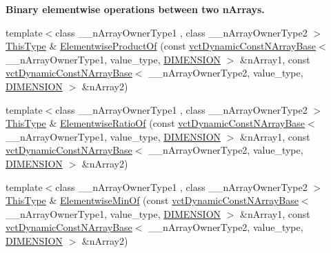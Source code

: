 \begin{Indent}{\bf Binary elementwise operations between two n\+Arrays.}
\begin{DoxyCompactItemize}
\item 
{\footnotesize template$<$class \+\_\+\+\_\+n\+Array\+Owner\+Type1 , class \+\_\+\+\_\+n\+Array\+Owner\+Type2 $>$ }\\\hyperlink{classvct_dynamic_const_n_array_base_a5123caffcf1455a1b99003877eade897}{This\+Type} \& \hyperlink{classvct_dynamic_n_array_base_a703a8bd5b1b643365ee9917a66a0ab30}{Elementwise\+Product\+Of} (const \hyperlink{classvct_dynamic_const_n_array_base}{vct\+Dynamic\+Const\+N\+Array\+Base}$<$ \+\_\+\+\_\+n\+Array\+Owner\+Type1, value\+\_\+type, \hyperlink{classvct_dynamic_n_array_base_aa66532d28588bdf26d08fb593db815d6abfcde386ec801b212d7c42d63a4f3837}{D\+I\+M\+E\+N\+S\+I\+O\+N} $>$ \&n\+Array1, const \hyperlink{classvct_dynamic_const_n_array_base}{vct\+Dynamic\+Const\+N\+Array\+Base}$<$ \+\_\+\+\_\+n\+Array\+Owner\+Type2, value\+\_\+type, \hyperlink{classvct_dynamic_n_array_base_aa66532d28588bdf26d08fb593db815d6abfcde386ec801b212d7c42d63a4f3837}{D\+I\+M\+E\+N\+S\+I\+O\+N} $>$ \&n\+Array2)
\item 
{\footnotesize template$<$class \+\_\+\+\_\+n\+Array\+Owner\+Type1 , class \+\_\+\+\_\+n\+Array\+Owner\+Type2 $>$ }\\\hyperlink{classvct_dynamic_const_n_array_base_a5123caffcf1455a1b99003877eade897}{This\+Type} \& \hyperlink{classvct_dynamic_n_array_base_aeab4d58e6af9be92ae2bc183eb971d92}{Elementwise\+Ratio\+Of} (const \hyperlink{classvct_dynamic_const_n_array_base}{vct\+Dynamic\+Const\+N\+Array\+Base}$<$ \+\_\+\+\_\+n\+Array\+Owner\+Type1, value\+\_\+type, \hyperlink{classvct_dynamic_n_array_base_aa66532d28588bdf26d08fb593db815d6abfcde386ec801b212d7c42d63a4f3837}{D\+I\+M\+E\+N\+S\+I\+O\+N} $>$ \&n\+Array1, const \hyperlink{classvct_dynamic_const_n_array_base}{vct\+Dynamic\+Const\+N\+Array\+Base}$<$ \+\_\+\+\_\+n\+Array\+Owner\+Type2, value\+\_\+type, \hyperlink{classvct_dynamic_n_array_base_aa66532d28588bdf26d08fb593db815d6abfcde386ec801b212d7c42d63a4f3837}{D\+I\+M\+E\+N\+S\+I\+O\+N} $>$ \&n\+Array2)
\item 
{\footnotesize template$<$class \+\_\+\+\_\+n\+Array\+Owner\+Type1 , class \+\_\+\+\_\+n\+Array\+Owner\+Type2 $>$ }\\\hyperlink{classvct_dynamic_const_n_array_base_a5123caffcf1455a1b99003877eade897}{This\+Type} \& \hyperlink{classvct_dynamic_n_array_base_aa29a945c1f4ce1bb02ca5f5c0c79a343}{Elementwise\+Min\+Of} (const \hyperlink{classvct_dynamic_const_n_array_base}{vct\+Dynamic\+Const\+N\+Array\+Base}$<$ \+\_\+\+\_\+n\+Array\+Owner\+Type1, value\+\_\+type, \hyperlink{classvct_dynamic_n_array_base_aa66532d28588bdf26d08fb593db815d6abfcde386ec801b212d7c42d63a4f3837}{D\+I\+M\+E\+N\+S\+I\+O\+N} $>$ \&n\+Array1, const \hyperlink{classvct_dynamic_const_n_array_base}{vct\+Dynamic\+Const\+N\+Array\+Base}$<$ \+\_\+\+\_\+n\+Array\+Owner\+Type2, value\+\_\+type, \hyperlink{classvct_dynamic_n_array_base_aa66532d28588bdf26d08fb593db815d6abfcde386ec801b212d7c42d63a4f3837}{D\+I\+M\+E\+N\+S\+I\+O\+N} $>$ \&n\+Array2)

\end{DoxyCompactItemize}
\end{Indent}
